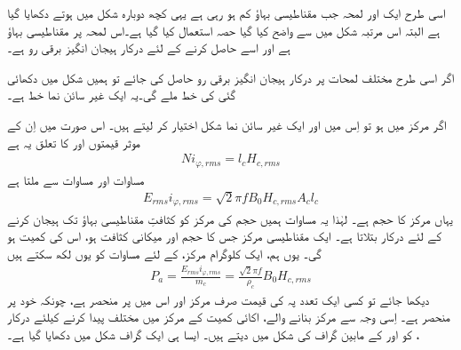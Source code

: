 اسی طرح ایک اور لمحہ  جب مقناطیسی بہاؤ کم ہو رہی ہے یہی کچھ دوبارہ شکل  میں ہوتے دکھایا گیا ہے البتہ اس مرتبہ شکل  میں  سے واضح کیا گیا حصہ استعمال کیا گیا ہے۔اس لمحہ پر مقناطیسی بہاؤ  ہے اور اسے حاصل کرنے کے لئے درکار ہیجان انگیز برقی رو  ہے۔

اگر اسی طرح مختلف لمحات پر درکار ہیجان انگیز برقی رو حاصل کی جائے تو ہمیں شکل میں دکھائی گئی   کی خط ملے گی۔یہ ایک غیر سائن نما خط ہے۔

 اگر مرکز میں   ہو  تو اِس میں  اور  ایک غیر سائن نما شکل اختیار کر لیتے ہیں۔ اس صورت میں  اِن کے موثر قیمتوں  اور   کا تعلق یہ ہے
\begin{align}\label{مساوات_مقناطیسی_دور_دباو_برابر_شدت_ضرب_لمبائی}
N i_{\varphi,rms}=l_c H_{c,rms}
\end{align}
مساوات    اور مساوات   سے ملتا ہے
\begin{align}\label{مساوات_مقناطیسی_دور_درکار_دباو_ضرب_رو}
E_{rms} i_{\varphi,rms}=\sqrt{2} \pi f B_0 H_{c,rms} A_c l_c
\end{align}
یہاں  مرکز کا حجم ہے۔ لہٰذا یہ مساوات ہمیں  حجم کی مرکز  کو  کثافتِ مقناطیسی بہاؤ تک ہیجان کرنے کے لئے درکار  بتلاتا ہے۔ ایک مقناطیسی مرکز جس کا حجم   اور  میکانی کثافت   ہو، اس کی کمیت  ہو گی۔ یوں ہم، ایک کلوگرام  مرکز، کے لئے مساوات    کو یوں لکھ سکتے ہیں
\begin{align}
P_a=\frac{E_{rms} i_{\varphi,rms}}{m_c}=\frac{\sqrt{2} \pi f}{\rho_c} B_0 H_{c,rms}
\end{align}
دیکھا جائے تو کسی ایک تعدد   پہ  کی قیمت صرف مرکز اور اس میں  پر منحصر ہے، چونکہ  خود  پر منحصر ہے۔ اِسی وجہ سے مرکز بنانے والے، اکائی کمیت کے مرکز میں مختلف  پیدا کرنے کیلئے درکار ، کو  اور  کے مابین گراف کی شکل میں دیتے ہیں۔ ایسا ہی ایک گراف شکل میں دکھایا گیا ہے۔
